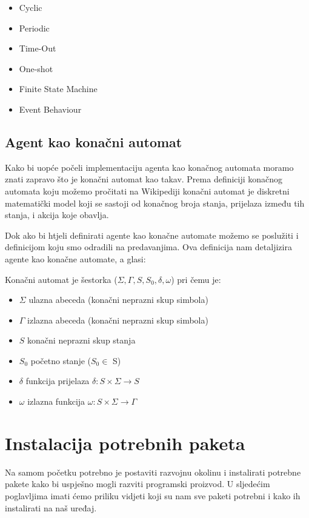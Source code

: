 \documentclass[]{foi} %
\begin{document}
\begin{itemize}
  \item Cyclic
  \item Periodic 
  \item Time-Out
  \item One-shot
  \item Finite State Machine 
  \item Event Behaviour
\end{itemize}

\section{Agent kao konačni automat}
Kako bi uopće počeli implementaciju agenta kao konačnog automata moramo znati zapravo što je konačni automat kao takav. Prema definiciji konačnog automata koju možemo pročitati na Wikipediji konačni automat je diskretni matematički model koji se sastoji od konačnog broja stanja, prijelaza između tih stanja, i akcija koje obavlja. \cite{konacniAutomat} 

Dok ako bi htjeli definirati agente kao konačne automate možemo se poslužiti i definicijom koju smo odradili na predavanjima. Ova definicija nam detaljizira agente kao konačne automate, a glasi:

Konačni automat je šestorka (\(\Sigma, \Gamma, S, S_0, \delta, \omega\)) pri čemu je:
\begin{itemize}
  \item \(\Sigma\) ulazna abeceda (konačni neprazni skup simbola)
  \item \(\Gamma\) izlazna abeceda (konačni neprazni skup simbola)
  \item \(S\) konačni neprazni skup stanja
  \item \(S_0\) početno stanje (\(S_0 \in\) S)
  \item \(\delta\) funkcija prijelaza \( \delta : S \times \Sigma \rightarrow S\)
  \item \(\omega\) izlazna funkcija \( \omega : S \times \Sigma \rightarrow \Gamma\)
\end{itemize}\cite{agentiKonacniAutomati}

\chapter{Instalacija potrebnih paketa}
Na samom početku potrebno je postaviti razvojnu okolinu i instalirati potrebne pakete kako bi uspješno mogli razviti programski proizvod. U sljedećim poglavljima imati ćemo priliku vidjeti koji su nam sve paketi potrebni i kako ih instalirati na naš uređaj.
\end{document}
